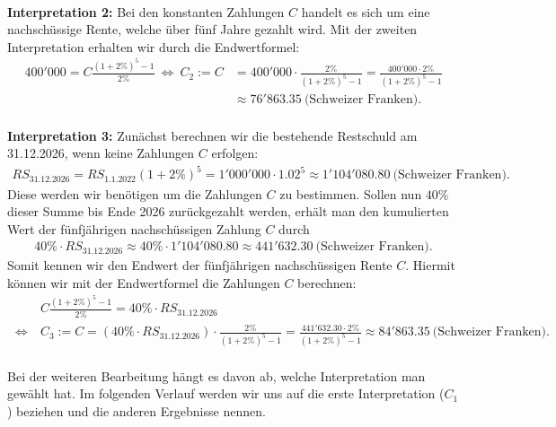 \ \\
\textbf{Interpretation 2:}
Bei den konstanten Zahlungen $C$ handelt es sich um eine nachschüssige Rente, welche über fünf Jahre gezahlt wird.
Mit der zweiten Interpretation erhalten wir durch die Endwertformel:
\begin{align*}
	400'000
	=
	C \frac{(1+2\%)^5 -1 }{2 \%}
	\ \Leftrightarrow \
	C_2 := C
	&= 400'000 \cdot
	\frac{2 \%}{(1+2\%)^5 -1}
	=
	\frac{ 400' 000 \cdot 2 \%}{(1+2\%)^5 -1}\\
	&\approx
	76'863.35
	\ \textrm{(Schweizer Franken)}.
\end{align*}
\ \\
\textbf{Interpretation 3:}
Zunächst berechnen wir die bestehende Restschuld am 31.12.2026, wenn keine Zahlungen $C$ erfolgen:
\begin{align*}
	RS_{\mathrm{31.12.2026}}
	=
	RS_{\mathrm{1.1.2022}} ( 1+ 2 \%)^5
	=
	1'000'000 \cdot 1.02^5 
	\approx
	1'104'080.80 \ \textrm{(Schweizer Franken)}.
\end{align*}
Diese werden wir benötigen um die Zahlungen $C$ zu bestimmen.
Sollen nun $40 \% $ dieser Summe bis Ende 2026 zurückgezahlt werden, erhält man den kumulierten Wert der fünfjährigen nachschüssigen Zahlung $C$ durch
\begin{align*}
	40 \% \cdot RS_{\mathrm{31.12.2026}}
	\approx
	40 \% \cdot	1 '104 '080.80
	\approx
	441' 632.30 \ \textrm{(Schweizer Franken)}.
\end{align*}
Somit kennen wir den Endwert der fünfjährigen nachschüssigen Rente $C$. Hiermit können wir mit der Endwertformel die Zahlungen $C$ berechnen:
\begin{align*}
	&C \frac{(1+2\%)^5 -1 }{2 \%} = 40 \% \cdot RS_{\mathrm{31.12.2026}}\\
	\ \Leftrightarrow \
	&C_3 := C 
	= (40 \% \cdot RS_{\mathrm{31.12.2026}}) \cdot \frac{2 \%}{(1+2\%)^5 -1 }
	=
	\frac{441' 632.30  \cdot 2 \%}{(1+2\%)^5 -1 }
	\approx 84 '863.35
	\ \textrm{(Schweizer Franken)}.
\end{align*}
\ \\
Bei der weiteren Bearbeitung hängt es davon ab, welche Interpretation man gewählt hat. Im folgenden Verlauf werden wir uns auf die erste Interpretation ($C_1$) beziehen und die anderen Ergebnisse nennen.

